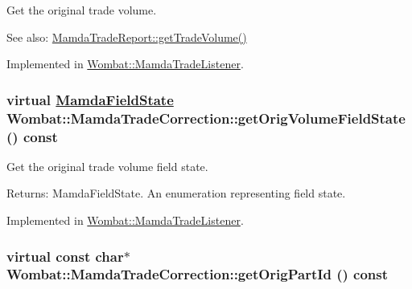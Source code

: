 Get the original trade volume. 

\begin{Desc}
\item[See also:]\hyperlink{classWombat_1_1MamdaTradeReport_167dd8f71093494ce5d0ff7a85739cbf}{Mamda\-Trade\-Report::get\-Trade\-Volume()} \end{Desc}


Implemented in \hyperlink{classWombat_1_1MamdaTradeListener_0e179272d95923e3da5df3bf67bfb643}{Wombat::Mamda\-Trade\-Listener}.\hypertarget{classWombat_1_1MamdaTradeCorrection_83d22071b9cc7efd25faa237b4cdee22}{
\subsubsection[getOrigVolumeFieldState]{\setlength{\rightskip}{0pt plus 5cm}virtual \hyperlink{namespaceWombat_93aac974f2ab713554fd12a1fa3b7d2a}{Mamda\-Field\-State} Wombat::Mamda\-Trade\-Correction::get\-Orig\-Volume\-Field\-State () const}}
\label{classWombat_1_1MamdaTradeCorrection_83d22071b9cc7efd25faa237b4cdee22}


Get the original trade volume field state. 

\begin{Desc}
\item[Returns:]Mamda\-Field\-State. An enumeration representing field state. \end{Desc}


Implemented in \hyperlink{classWombat_1_1MamdaTradeListener_359006736d830e51323d578d45f7adc7}{Wombat::Mamda\-Trade\-Listener}.\hypertarget{classWombat_1_1MamdaTradeCorrection_f0e85b637a8f2c26d4b7e4b1247e56c0}{
\subsubsection[getOrigPartId]{\setlength{\rightskip}{0pt plus 5cm}virtual const char$\ast$ Wombat::Mamda\-Trade\-Correction::get\-Orig\-Part\-Id () const}}
\label{classWombat_1_1MamdaTradeCorrection_f0e85b637a8f2c26d4b7e4b1247e56c0}


